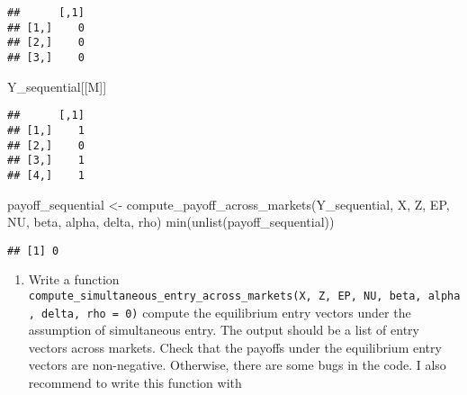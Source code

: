 \documentclass[
]{article}
\newenvironment{Shaded}{\begin{snugshade}}{\end{snugshade}}
\newcommand{\FunctionTok}[1]{\textcolor[rgb]{0.00,0.00,0.00}{#1}}
\newcommand{\NormalTok}[1]{#1}
\newcommand{\OtherTok}[1]{\textcolor[rgb]{0.56,0.35,0.01}{#1}}
\providecommand{\tightlist}{%
  \setlength{\itemsep}{0pt}\setlength{\parskip}{0pt}}
\begin{document}
\begin{verbatim}
##      [,1]
## [1,]    0
## [2,]    0
## [3,]    0
\end{verbatim}

\begin{Shaded}
\begin{Highlighting}[]
\NormalTok{Y\_sequential[[M]]}
\end{Highlighting}
\end{Shaded}

\begin{verbatim}
##      [,1]
## [1,]    1
## [2,]    0
## [3,]    1
## [4,]    1
\end{verbatim}

\begin{Shaded}
\begin{Highlighting}[]
\NormalTok{payoff\_sequential }\OtherTok{\textless{}{-}}
  \FunctionTok{compute\_payoff\_across\_markets}\NormalTok{(Y\_sequential, X, Z, EP, NU, beta, alpha, delta, rho)}
\FunctionTok{min}\NormalTok{(}\FunctionTok{unlist}\NormalTok{(payoff\_sequential))}
\end{Highlighting}
\end{Shaded}

\begin{verbatim}
## [1] 0
\end{verbatim}

\begin{enumerate}
\def\labelenumi{\arabic{enumi}.}
\setcounter{enumi}{7}
\tightlist
\item
  Write a function
  \texttt{compute\_simultaneous\_entry\_across\_markets(X,\ Z,\ EP,\ NU,\ beta,\ alpha,\ delta,\ rho\ =\ 0)}
  compute the equilibrium entry vectors under the assumption of
  simultaneous entry. The output should be a list of entry vectors
  across markets. Check that the payoffs under the equilibrium entry
  vectors are non-negative. Otherwise, there are some bugs in the code.
  I also recommend to write this function with
\end{enumerate}
\end{document}
